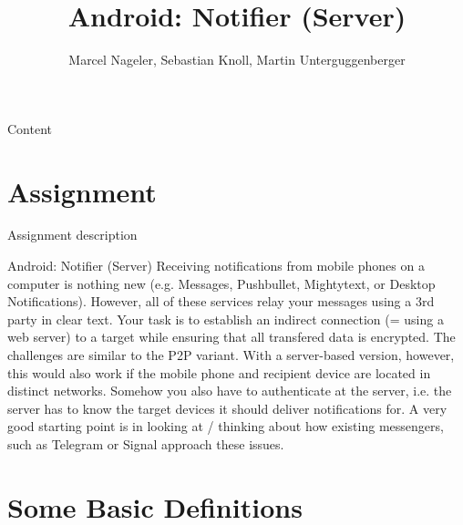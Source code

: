 \documentclass[aspectratio=169]{beamer}
\title{Android: Notifier (Server)}
\date{\presdate}
\author{Marcel Nageler, Sebastian Knoll, Martin Unterguggenberger}
\institute{}
\begin{document}
  \maketitle

  \begin{frame}{Content}
    \tableofcontents
  \end{frame}


\section{Assignment}

  \begin{frame}{Assignment description}
    \begin{block}{Android: Notifier (Server)}
      Receiving notifications from mobile phones on a computer is nothing new (e.g. Messages, Pushbullet, Mightytext, or Desktop Notifications).
      However, all of these services relay your messages using a 3rd party in clear text. Your task is to establish an indirect connection (= using a web server) to a target while ensuring that all transfered data is encrypted. The challenges are similar to the P2P variant. 
      With a server-based version, however, this would also work if the mobile phone and recipient device are located in distinct networks. 
      Somehow you also have to authenticate at the server, i.e. the server has to know the target devices it should deliver notifications for. 
      A very good starting point is in looking at / thinking about how existing messengers, such as Telegram or Signal approach these issues. 
    \end{block}
  \end{frame}

\section{Some Basic Definitions}
\end{document}
